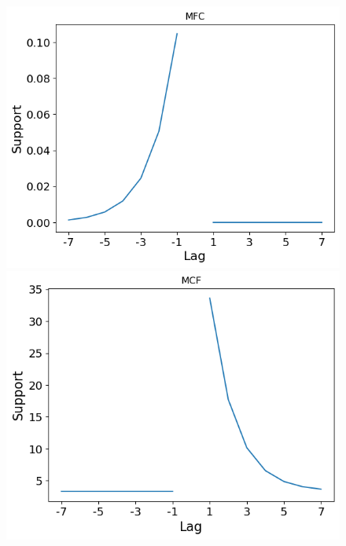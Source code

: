 \documentclass[
  letterpaper,
  11pt,
  english,
  singlespacing,
  headsepline]{MastersDoctoralThesis}
\begin{document}
\begin{figure}

\begin{minipage}{0.33\linewidth}
\includegraphics{icmr_figures/mfc_lag_connectivity.png}\end{minipage}%
%
\begin{minipage}{0.33\linewidth}
\includegraphics{icmr_figures/mcf_lag_connectivity.png}\end{minipage}%
%
\begin{minipage}{0.33\linewidth}

\end{minipage}
\end{figure}
\end{document}
